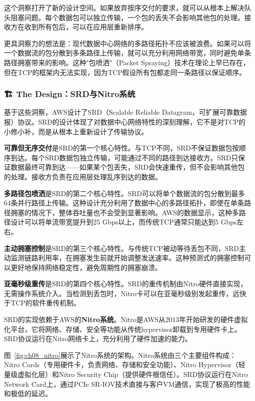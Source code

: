 这个洞察打开了新的设计空间。如果放弃按序交付的要求，就可以从根本上解决队头阻塞问题。每个数据包可以独立传输，一个包的丢失不会影响其他包的处理。接收方在收到所有包后，可以在应用层重新排序。

更具洞察力的想法是：现代数据中心网络的多路径拓扑不应该被浪费。如果可以将一个数据流的包分散到多条路径上传输，就可以充分利用网络带宽，同时避免单条路径拥塞带来的影响。这种"包喷洒"（Packet Spraying）技术在理论上早已存在，但在TCP的框架内无法实现，因为TCP假设所有包都走同一条路径以保证顺序。

\subsubsection{🏗️ The Design：SRD与Nitro系统}

基于这些洞察，AWS设计了SRD（Scalable Reliable Datagram，可扩展可靠数据报）协议。SRD的设计体现了对数据中心网络特性的深刻理解，它不是对TCP的小修小补，而是从根本上重新设计了传输协议。

\textbf{可靠但无序交付}是SRD的第一个核心特性。与TCP不同，SRD不保证数据包按顺序到达。每个SRD数据包独立传输，可能通过不同的路径到达接收方。SRD只保证数据最终可靠到达——如果某个包丢失，SRD会快速重传，但不会影响其他包的处理。接收方负责在应用层处理乱序到达的数据。

\textbf{多路径包喷洒}是SRD的第二个核心特性。SRD可以将单个数据流的包分散到最多64条并行路径上传输。这种设计充分利用了数据中心的多路径拓扑，即使在单条路径拥塞的情况下，整体吞吐量也不会受到显著影响。AWS的数据显示，这种多路径设计可以将单流带宽提升到25 Gbps以上，而传统TCP通常只能达到5 Gbps左右。

\textbf{主动拥塞控制}是SRD的第三个核心特性。与传统TCP被动等待丢包不同，SRD主动监测链路利用率，在拥塞发生前就开始调整发送速率。这种预测式的拥塞控制可以更好地保持网络稳定性，避免周期性的拥塞崩溃。

\textbf{亚毫秒级重传}是SRD的第四个核心特性。SRD的重传机制由Nitro硬件直接实现，无需操作系统介入。当检测到丢包时，Nitro卡可以在亚毫秒级别发起重传，远快于TCP的软件重传机制。

SRD的实现依赖于AWS的\textbf{Nitro系统}。Nitro是AWS从2013年开始研发的硬件虚拟化平台，它将网络、存储、安全等功能从传统hypervisor卸载到专用硬件卡上。SRD协议运行在Nitro网络卡上，充分利用了硬件加速的能力。

图~\ref{fig:ch08_nitro}展示了Nitro系统的架构。Nitro系统由三个主要组件构成：Nitro Cards（专用硬件卡，负责网络、存储和安全功能）、Nitro Hypervisor（轻量级虚拟化层）和Nitro Security Chip（提供硬件根信任）。SRD协议运行在Nitro Network Card上，通过PCIe SR-IOV技术直接与客户VM通信，实现了极高的性能和极低的延迟。

